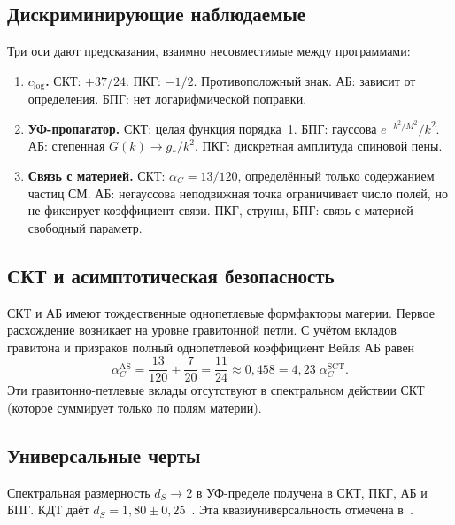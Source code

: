 \documentclass[12pt,a4paper]{article}
\theoremstyle{plain}
\theoremstyle{definition}
\theoremstyle{remark}
\begin{document}
\subsection{Дискриминирующие наблюдаемые}
\label{sec:discriminating}

Три оси дают предсказания, взаимно несовместимые между программами:
\begin{enumerate}[(1)]
\item \textbf{$c_{\log}$.} СКТ: $+37/24$. ПКГ: $-1/2$.
  Противоположный знак. АБ: зависит от определения. БПГ: нет
  логарифмической поправки.

\item \textbf{УФ-пропагатор.} СКТ: целая функция порядка~1.
  БПГ: гауссова $e^{-k^2/M^2}/k^2$. АБ: степенная
  $G(k) \to g_*/k^2$. ПКГ: дискретная амплитуда спиновой пены.

\item \textbf{Связь с материей.} СКТ: $\alpha_C = 13/120$,
  определённый только содержанием частиц СМ. АБ: негауссова
  неподвижная точка ограничивает число полей, но не фиксирует
  коэффициент связи. ПКГ, струны, БПГ: связь с материей ---
  свободный параметр.
\end{enumerate}

\subsection{СКТ и асимптотическая безопасность}
\label{sec:AS}

СКТ и АБ имеют тождественные однопетлевые формфакторы материи.
Первое расхождение возникает на уровне гравитонной петли.
С учётом вкладов гравитона и призраков полный однопетлевой
коэффициент Вейля АБ равен~\cite{SCM:2010}
\begin{equation}\label{eq:AS-alphaC}
  \alpha_C^{\mathrm{AS}} = \frac{13}{120} + \frac{7}{20}
  = \frac{11}{24} \approx 0{,}458
  = 4{,}23\;\alpha_C^{\mathrm{SCT}}.
\end{equation}
Эти гравитонно-петлевые вклады отсутствуют в спектральном
действии СКТ (которое суммирует только по полям материи).

\subsection{Универсальные черты}
\label{sec:universal}

Спектральная размерность $d_S \to 2$ в УФ-пределе получена в СКТ,
ПКГ, АБ и БПГ. КДТ даёт $d_S = 1{,}80 \pm 0{,}25$~\cite{AJL:2005}. Эта квазиуниверсальность отмечена
в~\cite{Carlip:2017}.
\end{document}
